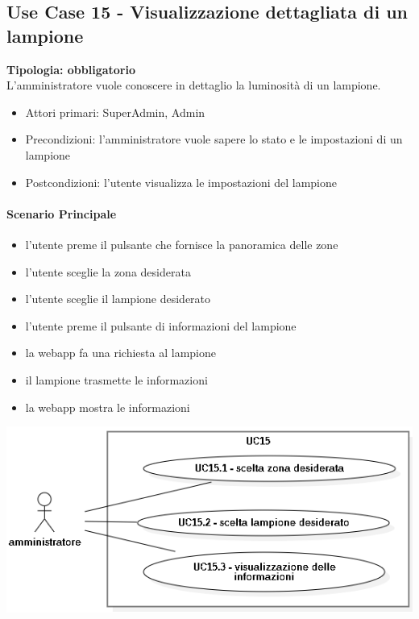 \documentclass[12pt]{article}
\begin{document}
\subsection{Use Case 15 - Visualizzazione dettagliata di un lampione}
\textbf{Tipologia: obbligatorio} \\
L'amministratore vuole conoscere in dettaglio la luminosità di un lampione.
\begin{itemize}
	\item Attori primari: SuperAdmin, Admin
	\item Precondizioni: l'amministratore vuole sapere lo stato e le impostazioni di un lampione
	\item Postcondizioni: l'utente visualizza le impostazioni del lampione
\end{itemize}
\paragraph{Scenario Principale}
\begin{itemize}
	\item l'utente preme il pulsante che fornisce la panoramica delle zone
	\item l'utente sceglie la zona desiderata
	\item l'utente sceglie il lampione desiderato
	\item l'utente preme il pulsante di informazioni del lampione
	\item la webapp fa una richiesta al lampione
	\item il lampione trasmette le informazioni
	\item la webapp mostra le informazioni
\end{itemize}

\includegraphics[scale=0.5]{UC15.png}
\end{document}

